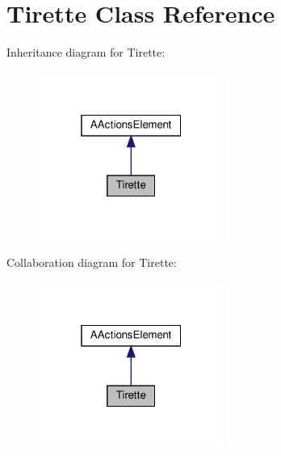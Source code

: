 \hypertarget{classTirette}{}\section{Tirette Class Reference}
\label{classTirette}


Inheritance diagram for Tirette\+:
\nopagebreak
\begin{figure}[H]
\begin{center}
\leavevmode
\includegraphics[width=172pt]{classTirette__inherit__graph}
\end{center}
\end{figure}


Collaboration diagram for Tirette\+:
\nopagebreak
\begin{figure}[H]
\begin{center}
\leavevmode
\includegraphics[width=172pt]{classTirette__coll__graph}
\end{center}
\end{figure}
